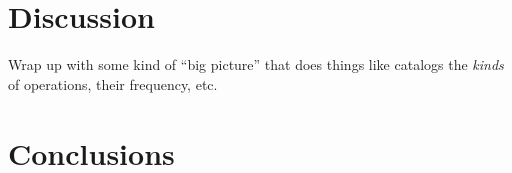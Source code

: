 \section{Discussion}
\label{sec:discussion}

Wrap up with some kind of ``big picture'' that does things like catalogs the
\emph{kinds} of operations, their frequency, etc.








\section{Conclusions}
\label{sec:conclusions}

